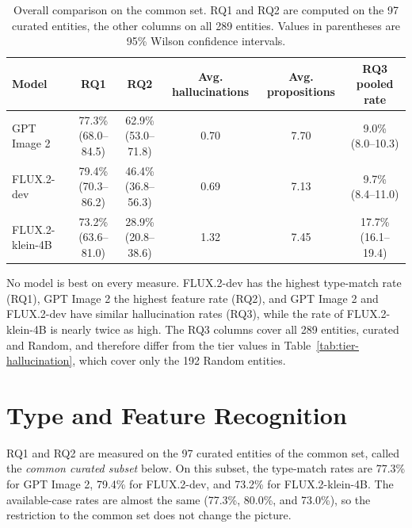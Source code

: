 \begin{table}[ht]
\centering
\scriptsize
\caption{Overall comparison on the common set. RQ1 and RQ2 are computed on the 97 curated entities, the other columns on all 289 entities. Values in parentheses are 95\% Wilson confidence intervals.}
\label{tab:fair-overall}
\begin{tabular}{lccccc}
\toprule
Model & RQ1 & RQ2 & Avg. hallucinations & Avg. propositions & RQ3 pooled rate \\
\midrule
GPT Image 2 & \shortstack{77.3\%\\(68.0--84.5)} & \shortstack{62.9\%\\(53.0--71.8)} & 0.70 & 7.70 & \shortstack{9.0\%\\(8.0--10.3)} \\
FLUX.2-dev & \shortstack{79.4\%\\(70.3--86.2)} & \shortstack{46.4\%\\(36.8--56.3)} & 0.69 & 7.13 & \shortstack{9.7\%\\(8.4--11.0)} \\
FLUX.2-klein-4B & \shortstack{73.2\%\\(63.6--81.0)} & \shortstack{28.9\%\\(20.8--38.6)} & 1.32 & 7.45 & \shortstack{17.7\%\\(16.1--19.4)} \\
\bottomrule
\end{tabular}
\end{table}

No model is best on every measure. FLUX.2-dev has the highest type-match rate
(RQ1), GPT Image 2 the highest feature rate (RQ2), and GPT Image 2 and
FLUX.2-dev have similar hallucination rates (RQ3), while the rate of
FLUX.2-klein-4B is nearly twice as high. The RQ3 columns cover all 289
entities, curated and Random, and therefore differ from the tier values in
Table~\ref{tab:tier-hallucination}, which cover only the 192 Random entities.

\section{Type and Feature Recognition}
\label{sec:rq12-results}

RQ1 and RQ2 are measured on the 97 curated entities of the common set, called
the \emph{common curated subset} below. On this subset, the type-match rates
are 77.3\% for GPT Image 2, 79.4\% for FLUX.2-dev, and 73.2\% for
FLUX.2-klein-4B. The available-case rates are almost the same (77.3\%,
80.0\%, and 73.0\%), so the restriction to the common set does not change the
picture.


